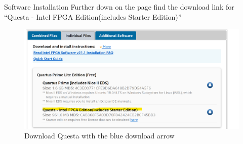 \documentclass[fleqn]{beamer}
\newcommand{\quotes}[1]{``#1''}
\begin{document}
\begin{frame}{Software Installation}
    Further down on the page find the download link for \quotes{Questa - Intel FPGA Edition(includes Starter Edition)}
    \begin{figure}
        \centering
        \includegraphics[scale=.4]{figures/questadl.png}
        \caption{Download Questa with the blue download arrow}
        \label{fig:my_label}
    \end{figure}
\end{frame}
\end{document}
